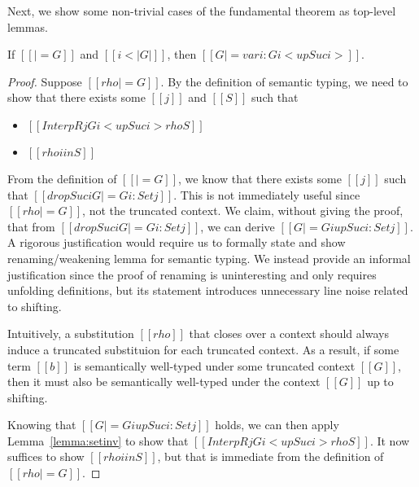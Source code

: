 \documentclass[acmsmall,screen=true,
\ifpublic review=false\else,review=true\fi
  ,anonymous=\ifanonymous true\else false\fi]{acmart}
\newcommand{\scw}[1]{}
\begin{document}

Next, we show some non-trivial cases of the fundamental theorem as
top-level lemmas.
\begin{lemma}[ST-Var]
  \label{lemma:stvar}
  If $[[|= G]]$ and $[[i < |G|]]$, then $[[G |= var i : G i < up Suc i  >]]$.
\end{lemma}
\begin{proof}
  Suppose $[[rho |= G]]$. By the definition of semantic typing, we
need to show that there exists some $[[j]]$ and $[[S]]$ such that
  \begin{itemize}
  \item $[[InterpR j G i < up Suc i > { rho } S]]$
  \item $[[rho i in S]]$
  \end{itemize}
  From the definition of $[[|= G]]$, we know that there exists some
  $[[j]]$ such that $[[drop Suc i G |= G i : Set j]]$. This is not
  immediately useful since $[[rho |= G]]$, not the truncated
  context. We claim, without giving the proof, that from $[[drop Suc i
  G |= G i  : Set j]]$, we can derive $[[G |= G i {up Suc i} : Set
  j]]$. A rigorous justification would require us to formally state
  and show renaming/weakening lemma for semantic typing. We instead
  provide an informal justification since the proof of renaming
  is uninteresting and only requires unfolding definitions, but its
  statement introduces unnecessary line noise related to shifting.

  Intuitively, a substitution $[[rho]]$
  that closes over a context should always induce a truncated
  substituion for each truncated context. As a result, if
  some term $[[b]]$ is semantically well-typed under some truncated
  context $[[G]]$, then it must also be semantically well-typed under
  the context $[[G]]$ up to shifting.

  Knowing that $[[G |= G i {up Suc i} : Set j]]$ holds, we can then
  apply Lemma~\ref{lemma:setinv} to show that
  $[[InterpR j G i < up Suc i > { rho } S]]$. It now
  suffices to show $[[rho i in S]]$, but that is immediate from the
  definition of $[[rho |= G]]$.
\end{proof}
\end{document}
